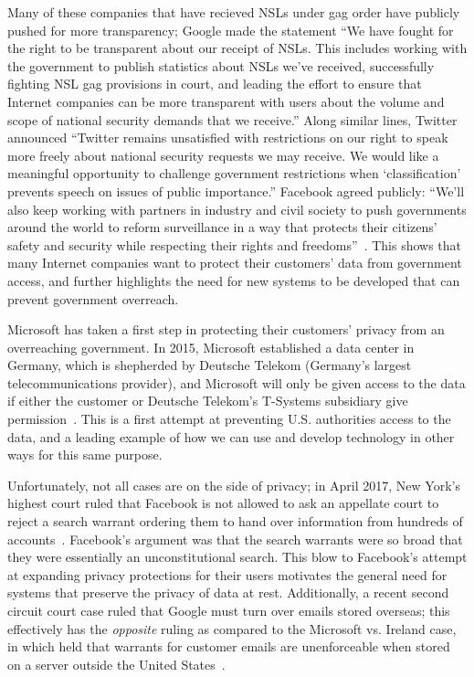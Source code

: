 Many of these companies that have recieved NSLs under gag order have publicly pushed for more transparency; Google made the statement ``We have fought for the right to be transparent about our receipt of NSLs. This includes working with the government to publish statistics about NSLs we’ve received, successfully fighting NSL gag provisions in court, and leading the effort to ensure that Internet companies can be more transparent with users about the volume and scope of national security demands that we receive.'' Along similar lines, Twitter announced ``Twitter remains unsatisfied with restrictions on our right to speak more freely about national security requests we may receive. We would like a meaningful opportunity to challenge government restrictions when ‘classification’ prevents speech on issues of public importance.''  Facebook agreed publicly: ``We'll also keep working with partners in industry and civil society to push governments around the world to reform surveillance in a way that protects their citizens’ safety and security while respecting their rights and freedoms''~\cite{cloudflare_gag}.  This shows that many Internet companies want to protect their customers' data from government access, and further highlights the need for new systems to be developed that can prevent government overreach.

Microsoft has taken a first step in protecting their customers' privacy from an overreaching government.  In 2015, Microsoft established a data center in Germany, which is shepherded by Deutsche Telekom (Germany's largest telecommunications provider), and Microsoft will only be given access to the data if either the customer or Deutsche Telekom's T-Systems subsidiary give permission~\cite{microsoft_germany}.  This is a first attempt at preventing U.S. authorities access to the data, and a leading example of how we can use and develop technology in other ways for this same purpose.

Unfortunately, not all cases are on the side of privacy; in April 2017, New York's highest court ruled that Facebook is not allowed to ask an appellate court to reject a search warrant ordering them to hand over information from hundreds of accounts~\cite{facebook_ny}.  Facebook's argument was that the search warrants were so broad that they were essentially an unconstitutional search.  This blow to Facebook's attempt at expanding privacy protections for their users motivates the general need for systems that preserve the privacy of data at rest.  Additionally, a recent second circuit court case ruled that Google must turn over emails stored overseas; this effectively has the {\it opposite} ruling as compared to the Microsoft vs. Ireland case, in which held that warrants for customer emails are unenforceable when stored on a server outside the United States~\cite{google_overseas,microsoft_ireland}. 

